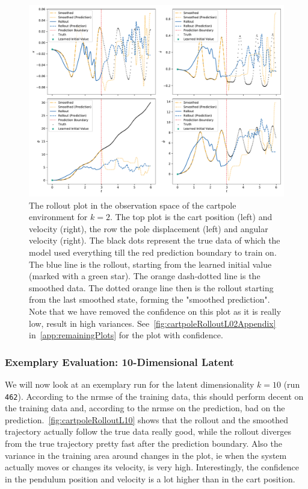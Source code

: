 			\begin{figure}
				\centering
				\includegraphics[width=\linewidth]{figures/results/cartpole-gym/run-latent-dim-02/without-confidence/rollout-observations-N0.pdf}
				\caption{The rollout plot in the observation space of the cartpole environment for \(k = 2\). The top plot is the cart position (left) and velocity (right), the row the pole displacement (left) and angular velocity (right). The black dots represent the true data of which the model used everything till the red prediction boundary to train on. The blue line is the rollout, starting from the learned initial value (marked with a green star). The orange dash-dotted line is the smoothed data. The dotted orange line then is the rollout starting from the last smoothed state, forming the "smoothed prediction". Note that we have removed the confidence on this plot as it is really low, result in high variances. See~\autoref{fig:cartpoleRolloutL02Appendix} in~\autoref{app:remainingPlots} for the plot with confidence.}
				\label{fig:cartpoleRolloutL02}
			\end{figure}

		\subsubsection{Exemplary Evaluation: 10-Dimensional Latent}
			We will now look at an exemplary run for the latent dimensionality \( k = 10 \) (run \texttt{462}). According to the \ac{nrmse} of the training data, this should perform decent on the training data and, according to the \ac{nrmse} on the prediction, bad on the prediction.~\autoref{fig:cartpoleRolloutL10} shows that the rollout and the smoothed trajectory actually follow the true data really good, while the rollout diverges from the true trajectory pretty fast after the prediction boundary. Also the variance in the training area around changes in the plot, \ac{ie} when the system actually moves or changes its velocity, is very high. Interestingly, the confidence in the pendulum position and velocity is a lot higher than in the cart position.

